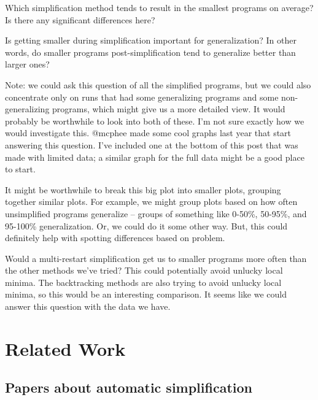     Which simplification method tends to result in the smallest programs on average? Is there any significant differences here?

    Is getting smaller during simplification important for generalization? In other words, do smaller programs post-simplification tend to generalize better than larger ones?

        Note: we could ask this question of all the simplified programs, but we could also concentrate only on runs that had some generalizing programs and some non-generalizing programs, which might give us a more detailed view. It would probably be worthwhile to look into both of these. I'm not sure exactly how we would investigate this. @mcphee made some cool graphs last year that start answering this question. I've included one at the bottom of this post that was made with limited data; a similar graph for the full data might be a good place to start.

    It might be worthwhile to break this big plot into smaller plots, grouping together similar plots. For example, we might group plots based on how often unsimplified programs generalize -- groups of something like 0-50\%, 50-95\%, and 95-100\% generalization. Or, we could do it some other way. But, this could definitely help with spotting differences based on problem.

    Would a multi-restart simplification get us to smaller programs more often than the other methods we've tried? This could potentially avoid unlucky local minima. The backtracking methods are also trying to avoid unlucky local minima, so this would be an interesting comparison. It seems like we could answer this question with the data we have.




\section{Related Work}
\label{sec:related}



\subsection{Papers about automatic simplification}

